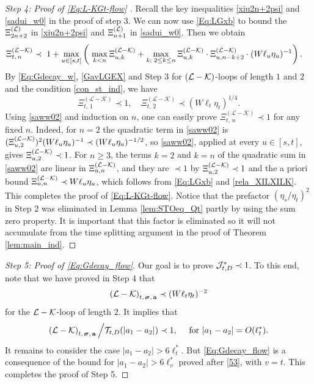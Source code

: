 \documentclass[10pt,reqno]{article}
\theoremstyle{plain} %
\theoremstyle{remark}
\numberwithin{equation}{section}
\begin{document}
\begin{proof}[Step 4: Proof of  \eqref{Eq:L-KGt-flow} ] 
 Recall the key inequalities \eqref{xiu2n+2psi} and  \eqref{sadui_w0} in the proof of step 3. 
We can now use \eqref{Eq:LGxb} to bound the $\Xi^{(\cal L)}_{2n+2}$ in \eqref{xiu2n+2psi} and $\Xi^{(\cal L)}_{n+1}$ in \eqref{sadui_w0}.    Then we obtain 
 \begin{align} \label{saww02}
 \Xi_{t,\,n }^{(\mathcal{L}-\mathcal{K})}  \prec\;  &\; 1+\max_{u\in [s,t]}
  \left(\; \max_{k<n }\Xi^{({\cal L-\cal K})}_{u,k}+\max_{k:\;2\le k\le n }\Xi^{({\cal L-\cal K})}_{u,k}\cdot \Xi^{({\cal L-\cal K})}_{u,n-k+2}\cdot(W\ell_u\eta_u)^{-1} \right).
\end{align}
 By   \eqref{Eq:Gdecay_w}, \eqref{GavLGEX} and Step 3 for $(\cal L-\cal K)$-loops of length $1$ and $2$ and 
 the  condition \eqref{con_st_ind}, we have 
 $$
  \Xi_{t,\,1 }^{(\mathcal{L}-\mathcal{K})}\prec 1, \quad 
   \Xi_{t,\,2 }^{(\mathcal{L}-\mathcal{K})}\prec (W\ell_t\eta_t)^{1/4}.
 $$
Using  \eqref{saww02} and induction on $n$, one can easily prove   
 $ \Xi_{t,\,n }^{(\mathcal{L}-\mathcal{K})}\prec 1
 $ for any fixed $n$. Indeed, for $n=2$ the quadratic term in \eqref{saww02} is $(\Xi^{({\cal L-\cal K})}_{u,2})^2(W\ell_u\eta_u)^{-1}\prec (W\ell_u\eta_u)^{-1/2}$, so \eqref{saww02}, applied at every $u\in[s,t]$, gives $\Xi^{({\cal L-\cal K})}_{u,2}\prec 1$. For $n\ge 3$, the terms $k=2$ and $k=n$ of the quadratic sum in \eqref{saww02} are linear in $\Xi^{({\cal L-\cal K})}_{u,n}$, and they are $\prec 1$ by $\Xi^{({\cal L-\cal K})}_{u,2}\prec 1$ and the a priori bound $\Xi^{({\cal L-\cal K})}_{u,n}\prec W\ell_u\eta_u$, which follows from \eqref{Eq:LGxb} and \eqref{rela_XILXILK}. This completes the proof of  \eqref{Eq:L-KGt-flow}. 
 Notice that the prefactor $(\eta_s/\eta_t)^2$  in Step 2 was eliminated in Lemma \ref{lem:STOeq_Qt}  partly by using the sum zero property. 
 It is important that this factor is eliminated so it will not  accumulate from    the time splitting argument  in the proof of Theorem \ref{lem:main_ind}.
\end{proof}
 
 
 
 

\begin{proof}[Step 5: Proof of \eqref{Eq:Gdecay_flow}]   
Our goal is to prove ${\cal J}^*_{t,D} \prec  1$. To this end,  note that 
we have  proved  in Step 4 that 
$$
\left({\cal L}-{\cal K}\right)_{t,\, \boldsymbol{\sigma},  \,\textbf{a}}\prec (W\ell_t\eta_t)^{-2} 
$$
for the ${\cal L}-{\cal K}$-loop of length $2$.  It implies that 
$$
 \left({\cal L}-{\cal K}\right)_{t,\, \boldsymbol{\sigma},  \,\textbf{a}}\Big/{\cal T}_{t, D}(|a_1-a_2|) \prec 1, \quad \text{ for } |a_1-a_2|=O(\ell_t^*).
$$
It remains to consider  the case $|a_1-a_2| > 6 \ell_t^*$. But \eqref{Eq:Gdecay_flow} is a consequence of the bound for $|a_1-a_2|>6\ell_v^*$ proved after \eqref{53}, with $v=t$. 
This completes the proof of Step 5. 

\end{proof}
\end{document}
